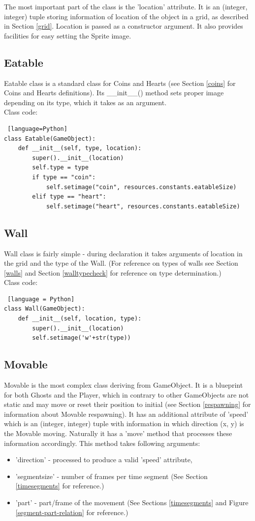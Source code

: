 \documentclass[11pt,a4paper,notitlepage]{report}
\newcommand{\dsubsection}[1]{\FloatBarrier \subsection{#1}}
\begin{document}
				The most important part of the class is the 'location' attribute. It is an (integer, integer) tuple storing information of location of the object in a grid, as described in Section \ref{grid}. Location is passed as a constructor argument. It also provides facilities for easy setting the Sprite image.
			\dsubsection{Eatable}
				Eatable class is a standard class for Coins and Hearts (see Section \ref{coins} for Coins and Hearts definitions).
				Its \_\_init\_\_() method sets proper image depending on its type, which it takes as an argument.\\
				Class code:
				\begin{lstlisting} [language=Python]
class Eatable(GameObject):
	def __init__(self, type, location):
		super().__init__(location)
		self.type = type
		if type == "coin":
			self.setimage("coin", resources.constants.eatableSize)
		elif type == "heart":
			self.setimage("heart", resources.constants.eatableSize)
				\end{lstlisting}
			\dsubsection{Wall}
				Wall class is fairly simple - during declaration it takes arguments of location in the grid and the type of the Wall. (For reference on types of walls see Section \ref{walls} and Section \ref{walltypecheck} for reference on type determination.)\\
				Class code:
				\begin{lstlisting} [language = Python] 
class Wall(GameObject):
	def __init__(self, location, type):
		super().__init__(location)
		self.setimage('w'+str(type))
				\end{lstlisting}
			\dsubsection{Movable}
				Movable is the most complex class deriving from GameObject. It is a blueprint for both Ghosts and the Player, which in contrary to other GameObjects are not static and may move or reset their position to initial (see Section \ref{respawning} for information about Movable respawning).
				It has an additional attribute of 'speed' which is an (integer, integer) tuple with information in which direction (x, y) is the Movable moving. Naturally it has a 'move' method that processes these information accordingly. This method takes following arguments:
				\begin{itemize}
					\item
						'direction' - processed to produce a valid 'speed' attribute,
					\item
						'segmentsize' - number of frames per time segment (See Section \ref{timesegments} for reference.)
					\item
						'part' - part/frame of the movement (See Sections \ref{timesegments} and Figure \ref{segment-part-relation} for reference.)
				\end{itemize}
\end{document}
